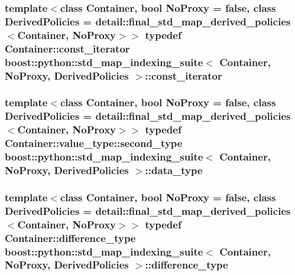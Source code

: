 \subsubsection[{const\+\_\+iterator}]{\setlength{\rightskip}{0pt plus 5cm}template$<$class Container, bool No\+Proxy = false, class Derived\+Policies = detail\+::final\+\_\+std\+\_\+map\+\_\+derived\+\_\+policies$<$\+Container, No\+Proxy$>$$>$ typedef Container\+::const\+\_\+iterator {\bf boost\+::python\+::std\+\_\+map\+\_\+indexing\+\_\+suite}$<$ Container, No\+Proxy, Derived\+Policies $>$\+::{\bf const\+\_\+iterator}}\label{classboost_1_1python_1_1std__map__indexing__suite_aae0c4473455223a4e048cc207ca7b3ea}
\hypertarget{classboost_1_1python_1_1std__map__indexing__suite_a3e9a6a8b8ba34759cf0ba99fe5966041}{}
\subsubsection[{data\+\_\+type}]{\setlength{\rightskip}{0pt plus 5cm}template$<$class Container, bool No\+Proxy = false, class Derived\+Policies = detail\+::final\+\_\+std\+\_\+map\+\_\+derived\+\_\+policies$<$\+Container, No\+Proxy$>$$>$ typedef Container\+::value\+\_\+type\+::second\+\_\+type {\bf boost\+::python\+::std\+\_\+map\+\_\+indexing\+\_\+suite}$<$ Container, No\+Proxy, Derived\+Policies $>$\+::{\bf data\+\_\+type}}\label{classboost_1_1python_1_1std__map__indexing__suite_a3e9a6a8b8ba34759cf0ba99fe5966041}
\hypertarget{classboost_1_1python_1_1std__map__indexing__suite_a54aa644dcb3913334f8b0152901940ef}{}
\subsubsection[{difference\+\_\+type}]{\setlength{\rightskip}{0pt plus 5cm}template$<$class Container, bool No\+Proxy = false, class Derived\+Policies = detail\+::final\+\_\+std\+\_\+map\+\_\+derived\+\_\+policies$<$\+Container, No\+Proxy$>$$>$ typedef Container\+::difference\+\_\+type {\bf boost\+::python\+::std\+\_\+map\+\_\+indexing\+\_\+suite}$<$ Container, No\+Proxy, Derived\+Policies $>$\+::{\bf difference\+\_\+type}}\label{classboost_1_1python_1_1std__map__indexing__suite_a54aa644dcb3913334f8b0152901940ef}
\hypertarget{classboost_1_1python_1_1std__map__indexing__suite_a4b2ac75883fba93dbca6d9e83197c842}{}
